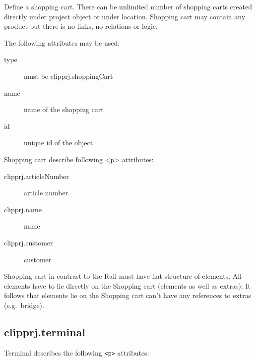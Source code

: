 \documentclass[%
	a4paper,
	oneside,
	listof=numbered,
	parskip=half,
	headsepline=true,
	footsepline=false,
	0.7headlines,
	]{scrbook}
\begin{document}
Define a shopping cart.
There can be unlimited number of shopping carts created directly under project object or under location.
Shopping cart may contain any product but there is no links, no relations or logic.

The following attributes may be used:

\begin{description}
	\item[type] must be clipprj.shoppingCart
	\item[name] name of the shopping cart
	\item[id] unique id of the object
\end{description}

Shopping cart describe following <p> attributes: 

\begin{description}
	\item[clipprj.articleNumber] article number 
	\item[clipprj.name] name 
	\item[clipprj.customer] customer 
\end{description}
 
Shopping cart in contrast to the Rail must have flat structure of elements.
All elements have to lie directly on the Shopping cart (elements as well as extras).
It follows that elements lie on the Shopping cart can’t have any references to extras (e.g.\ bridge).

\subsection{clipprj.terminal} 
 
Terminal describes the following \verb|<p>| attributes: 
\end{document}
